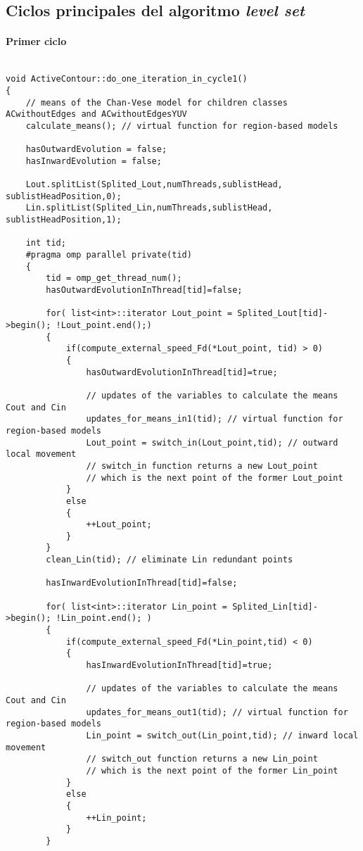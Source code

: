 \begin{appendices}

\chapter{Ciclos principales del algoritmo \textit{level set}}\label{apendice1}

\subsubsection{Primer ciclo}
\begin{lstlisting}

void ActiveContour::do_one_iteration_in_cycle1()
{
	// means of the Chan-Vese model for children classes ACwithoutEdges and ACwithoutEdgesYUV
	calculate_means(); // virtual function for region-based models
	
	hasOutwardEvolution = false;
	hasInwardEvolution = false;
	
	Lout.splitList(Splited_Lout,numThreads,sublistHead, sublistHeadPosition,0);
	Lin.splitList(Splited_Lin,numThreads,sublistHead, sublistHeadPosition,1);
	
	int tid;
	#pragma omp parallel private(tid)
	{
		tid = omp_get_thread_num();
		hasOutwardEvolutionInThread[tid]=false;     
		
		for( list<int>::iterator Lout_point = Splited_Lout[tid]->begin(); !Lout_point.end();)
		{
			if(compute_external_speed_Fd(*Lout_point, tid) > 0)
			{
				hasOutwardEvolutionInThread[tid]=true;
			
				// updates of the variables to calculate the means Cout and Cin
				updates_for_means_in1(tid); // virtual function for region-based models
				Lout_point = switch_in(Lout_point,tid); // outward local movement
				// switch_in function returns a new Lout_point
				// which is the next point of the former Lout_point
			}
			else
			{
				++Lout_point;
			}
		}
		clean_Lin(tid); // eliminate Lin redundant points
		
		hasInwardEvolutionInThread[tid]=false;
		
		for( list<int>::iterator Lin_point = Splited_Lin[tid]->begin(); !Lin_point.end(); )
		{
			if(compute_external_speed_Fd(*Lin_point,tid) < 0)
			{
				hasInwardEvolutionInThread[tid]=true;
				
				// updates of the variables to calculate the means Cout and Cin
				updates_for_means_out1(tid); // virtual function for region-based models
				Lin_point = switch_out(Lin_point,tid); // inward local movement
				// switch_out function returns a new Lin_point
				// which is the next point of the former Lin_point
			}
			else
			{
				++Lin_point;
			}
		}
		

\end{lstlisting}
\end{appendices}
